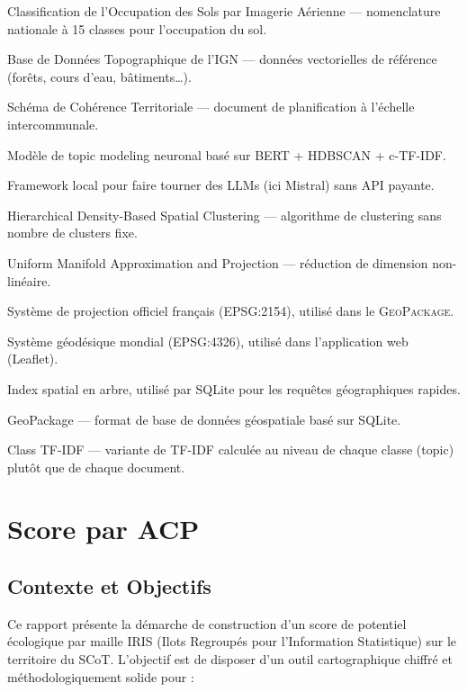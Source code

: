 \documentclass[11pt,a4paper]{report}
\newcommand{\gpkg}{\textsc{GeoPackage}}
\newcommand{\cosia}{\textsc{COSIA}}
\newcommand{\bdtopo}{\textsc{BD TOPO}}
\newcommand{\scot}{\textsc{SCoT}}
\begin{document}
\begin{description}[leftmargin=3cm, style=nextline]
  \item[\cosia{}] Classification de l'Occupation des Sols par Imagerie Aérienne — nomenclature nationale à 15 classes pour l'occupation du sol.
  \item[\bdtopo{}] Base de Données Topographique de l'IGN — données vectorielles de référence (forêts, cours d'eau, bâtiments…).
  \item[\scot{}] Schéma de Cohérence Territoriale — document de planification à l'échelle intercommunale.
  \item[BERTopic] Modèle de topic modeling neuronal basé sur BERT + HDBSCAN + c-TF-IDF.
  \item[Ollama] Framework local pour faire tourner des LLMs (ici Mistral) sans API payante.
  \item[HDBSCAN] Hierarchical Density-Based Spatial Clustering — algorithme de clustering sans nombre de clusters fixe.
  \item[UMAP] Uniform Manifold Approximation and Projection — réduction de dimension non-linéaire.
  \item[Lambert 93] Système de projection officiel français (EPSG:2154), utilisé dans le \gpkg{}.
  \item[WGS84] Système géodésique mondial (EPSG:4326), utilisé dans l'application web (Leaflet).
  \item[R-Tree] Index spatial en arbre, utilisé par SQLite pour les requêtes géographiques rapides.
  \item[\gpkg{}] GeoPackage — format de base de données géospatiale basé sur SQLite.
  \item[c-TF-IDF] Class TF-IDF — variante de TF-IDF calculée au niveau de chaque classe (topic) plutôt que de chaque document.
\end{description}

\chapter{Score par ACP}
\section{Contexte et Objectifs}

Ce rapport présente la démarche de construction d'un score de potentiel écologique par maille IRIS (Ilots Regroupés pour l'Information Statistique) sur le territoire du SCoT. L'objectif est de disposer d'un outil cartographique chiffré et méthodologiquement solide pour :
\end{document}
